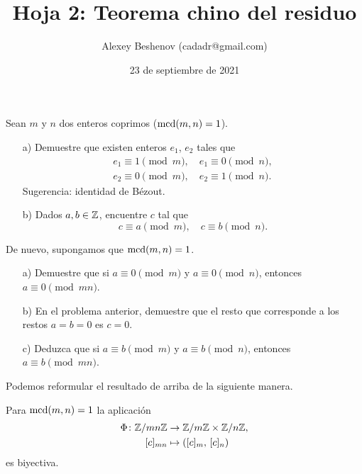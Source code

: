 \documentclass{article}
\title{Hoja 2: Teorema chino del residuo}
\author{Alexey Beshenov (cadadr@gmail.com)}
\date{23 de septiembre de 2021}
\begin{document}
\maketitle
\thispagestyle{empty}

\setcounter{section}{2}

\begin{problema}
  \label{probl:CRT-1}
  Sean $m$ y $n$ dos enteros coprimos ($\operatorname{mcd} (m,n) = 1$).

  \begin{itemize}
  \item[a)] Demuestre que existen enteros $e_1$, $e_2$ tales que
    \begin{gather*}
      e_1 \equiv 1 \pmod{m}, \quad e_1 \equiv 0 \pmod{n}, \\
      e_2 \equiv 0 \pmod{m}, \quad e_2 \equiv 1 \pmod{n}.
    \end{gather*}
    Sugerencia: identidad de Bézout.

  \item[b)] Dados $a, b \in \mathbb{Z}$, encuentre $c$ tal que
    $$c \equiv a \pmod{m}, \quad c \equiv b \pmod{n}.$$
  \end{itemize}
\end{problema}

\begin{problema}
  \label{probl:CRT-2}
  De nuevo, supongamos que $\operatorname{mcd} (m,n) = 1$.

  \begin{itemize}
  \item[a)] Demuestre que si $a \equiv 0 \pmod{m}$ y $a \equiv 0 \pmod{n}$,
    entonces $a \equiv 0 \pmod{mn}$.

  \item[b)] En el problema anterior, demuestre que el resto que corresponde a
    los restos $a = b = 0$ es $c = 0$.

  \item[c)] Deduzca que si $a \equiv b \pmod{m}$ y $a \equiv b \pmod{n}$,
    entonces $a \equiv b \pmod{mn}$.
  \end{itemize}
\end{problema}

Podemos reformular el resultado de arriba de la siguiente manera.

\begin{framed}
  Para $\operatorname{mcd} (m,n) = 1$ la aplicación
  \begin{align*}
    \Phi\colon \mathbb{Z}/mn\mathbb{Z} & \to \mathbb{Z}/m\mathbb{Z} \times \mathbb{Z}/n\mathbb{Z},\\
    [c]_{mn} & \mapsto ([c]_m, \, [c]_n)
  \end{align*}
  es biyectiva.
\end{framed}
\end{document}
